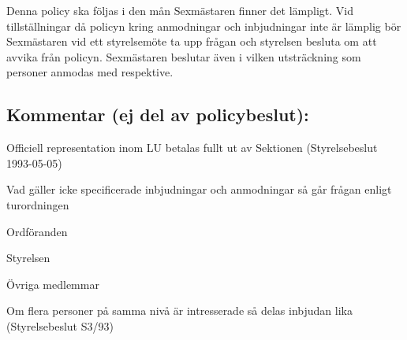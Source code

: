 \documentclass[10pt]{article}
\begin{document}
Denna policy ska följas i den mån Sexmästaren finner det lämpligt. Vid tillställningar då policyn kring anmodningar och inbjudningar inte är lämplig bör Sexmästaren vid ett styrelsemöte ta upp frågan och styrelsen besluta om att avvika från policyn. 
Sexmästaren beslutar även i vilken utsträckning som personer anmodas med respektive.

\vspace{20px}
\subsection*{Kommentar (ej del av policybeslut):}
\begin{dashlist}
    \item Officiell representation inom LU betalas fullt ut av Sektionen
    (Styrelsebeslut 1993-05-05)
    \item Vad gäller icke specificerade inbjudningar och anmodningar så går
    frågan enligt turordningen
    \begin{numplist}
    \item Ordföranden
    \item Styrelsen
    \item Övriga medlemmar
    \end{numplist}
    \item Om flera personer på samma nivå är intresserade så delas inbjudan lika
    (Styrelsebeslut S3/93)
\end{dashlist}
\end{document}
